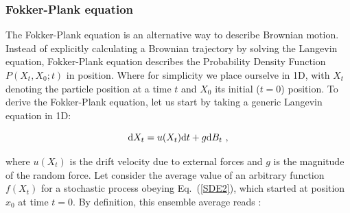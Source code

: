 %
%
%


\subsubsection{Fokker-Plank equation}

The Fokker-Plank equation is an alternative way to describe Brownian motion. Instead of explicitly calculating a Brownian trajectory by solving the Langevin equation, Fokker-Plank equation describes the Probability Density Function $P(X_t, X_0; t)$ in position. Where for simplicity we place ourselve in 1D, with $X_t$ denoting the particle position at a time $t$ and $X_0$ its initial ($t=0$) position. To derive the Fokker-Plank equation, let us start by taking a generic Langevin equation in 1D:

\begin{equation}
	\textnormal{d}X_t = u(X_t) \mathrm{d}t + g\textnormal{d}B_t ~,
	\label{SDE2}
\end{equation}

where $u(X_t)$ is the drift velocity due to external forces and $g$ is the magnitude of the random force. Let consider the average value of an arbitrary function $f(X_t)$ for a stochastic process obeying Eq.~(\ref{SDE2}), which started at position $x_0$ at time $t=0$. By definition, this ensemble average reads \cite{le_bellac_equilibrium_2004}:

